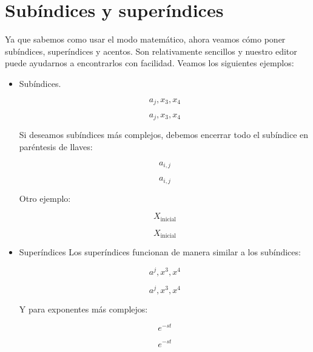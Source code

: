 \documentclass[graybox,envcountchap,sectrefs]{svmono}
\begin{document}
   \section{Subíndices y superíndices}
       Ya que sabemos como usar el modo matemático, ahora veamos cómo poner subíndices, superíndices y acentos.
       Son relativamente sencillos y nuestro editor puede ayudarnos a encontrarlos con facilidad. Veamos los siguientes ejemplos:
    \begin{itemize}
        \item Subíndices.
    \begin{tcbraster}[raster columns=2, raster equal height]
    \begin{code}
        \[ a_j, x_3, x_4 \]
    \end{code}
    \begin{compiled}
        \[ a_j, x_3, x_4 \]
    \end{compiled}
    \end{tcbraster}
    Si deseamos subíndices más complejos, debemos encerrar todo el subíndice en paréntesis de llaves:
    \begin{tcbraster}[raster columns=2, raster equal height]
    \begin{code}
        \[ a_{i,j}\]
    \end{code}
    \begin{compiled}
        \[ a_{i,j}\]
    \end{compiled}
    \end{tcbraster}

    Otro ejemplo:
    \begin{tcbraster}[raster columns=2, raster equal height]
    \begin{code}
        \[ X_{\text{inicial}} \]
    \end{code}
    \begin{compiled}
        \[ X_{\text{inicial}} \]
    \end{compiled}
    \end{tcbraster}

\item Superíndices
    Los superíndices funcionan de manera similar a los subíndices:
    \begin{tcbraster}[raster columns=2, raster equal height]
    \begin{code}
        \[ a^j, x^3, x^4 \]
    \end{code}
    \begin{compiled}
        \[ a^j, x^3, x^4 \]
    \end{compiled}
    \end{tcbraster}

    Y para exponentes más complejos:
    \begin{tcbraster}[raster columns=2, raster equal height]
    \begin{code}
        \[ e^{-st} \]
    \end{code}
    \begin{compiled}
        \[ e^{-st} \]
    \end{compiled}
    \end{tcbraster}


    \end{itemize}
\end{document}
